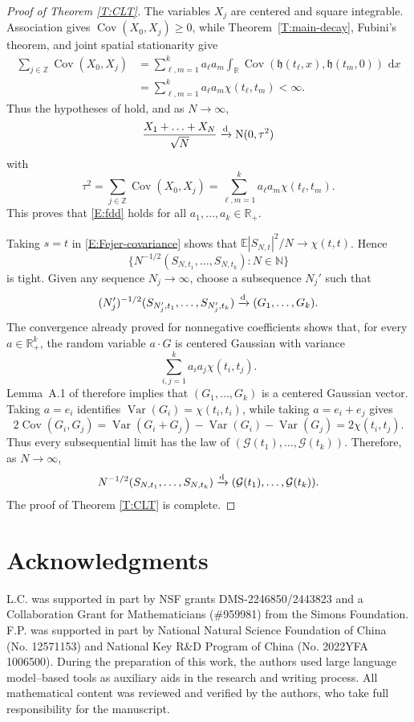 \documentclass[12pt, reqno]{amsart}
\numberwithin{equation}{section}
\theoremstyle{definition}
\newcommand{\R}{\mathbb{R}}
\newcommand{\E}{\mathbb{E}}
\newcommand{\Z}{\mathbb{Z}}
\newcommand{\N}{\mathbb{N}}
\newcommand{\h}{\mathfrak{h}}
\newcommand{\Cov}{\operatorname{Cov}}
\newcommand{\Var}{\operatorname{Var}}
\newcommand{\dd}{\,\mathrm{d}}
\begin{document}
\begin{proof}[Proof of Theorem \ref{T:CLT}]
  The variables $X_j$ are centered and square integrable. Association gives
  $\Cov(X_0,X_j)\ge0$, while Theorem~\ref{T:main-decay}, Fubini's theorem, and
  joint spatial stationarity give
  \begin{align*}
    \sum_{j\in\Z}\Cov(X_0,X_j)
    &=\sum_{\ell,m=1}^k a_\ell a_m
      \int_\R\Cov(\h(t_\ell,x),\h(t_m,0))\,\dd x\\
    &=\sum_{\ell,m=1}^k a_\ell a_m\chi(t_\ell,t_m)
    <\infty.
  \end{align*}
  Thus the hypotheses of \cite[Theorem~2]{newman:80:normal} hold, and as
  $N\to\infty$,
  \begin{align*}
    \frac{X_1+\ldots +X_N}{\sqrt{N}} \xrightarrow{\rm d} {\rm N}(0, \tau^2)
  \end{align*}
  with
  \[
    \tau^2=\sum_{j\in\Z}\Cov(X_0,X_j)
    =\sum_{\ell,m=1}^k a_\ell a_m\chi(t_\ell,t_m).
  \]
  This proves that
  \eqref{E:fdd} holds for all $a_1, \ldots, a_k\in \R_+$.

  Taking $s=t$ in \eqref{E:Fejer-covariance} shows that
  $\E|S_{N,t}|^2/N\to\chi(t,t)$. Hence
  \[
    \bigl\{N^{-1/2}(S_{N,t_1},\ldots,S_{N,t_k}):N\in\N\bigr\}
  \]
  is tight. Given any sequence $N_j\to\infty$, choose a subsequence $N_j'$ such
  that
  \[
    (N_j')^{-1/2}(S_{N_j',t_1},\ldots,S_{N_j',t_k})
    \xrightarrow{\rm d}(G_1,\ldots,G_k).
  \]
  The convergence already proved for nonnegative coefficients shows that, for
  every $a\in\R_+^k$, the random variable $a\cdot G$ is centered Gaussian with
  variance
  \[
    \sum_{i,j=1}^k a_i a_j\chi(t_i,t_j).
  \]
  Lemma~A.1 of \cite{mueller.pu:25:spatial} therefore implies that
  $(G_1,\ldots,G_k)$ is a centered Gaussian vector. Taking $a=e_i$ identifies
  $\Var(G_i)=\chi(t_i,t_i)$, while taking $a=e_i+e_j$ gives
  \[
    2\Cov(G_i,G_j)
    =\Var(G_i+G_j)-\Var(G_i)-\Var(G_j)
    =2\chi(t_i,t_j).
  \]
  Thus every subsequential limit has the law of
  $(\mathcal G(t_1),\ldots,\mathcal G(t_k))$. Therefore, as $N\to\infty$,
  \begin{align*}
    N^{-1/2}(S_{N,t_1},\ldots,S_{N,t_k})
    \xrightarrow{\rm d}(\mathcal G(t_1),\ldots,\mathcal G(t_k)).
  \end{align*}
  The proof of Theorem \ref{T:CLT} is complete.
\end{proof}



\section*{Acknowledgments} 
L.C. was supported in part by NSF grants DMS-2246850/2443823 and a Collaboration
Grant for Mathematicians (\#959981) from the Simons Foundation. F.P. was
supported in part by National Natural Science Foundation of China (No. 12571153)
and National Key R\&D Program of China (No. 2022YFA 1006500). During the preparation of this work, the authors used large language model–based tools as auxiliary aids in the research and writing process. All mathematical content was reviewed and verified by the authors, who take full responsibility for the manuscript.
\end{document}
